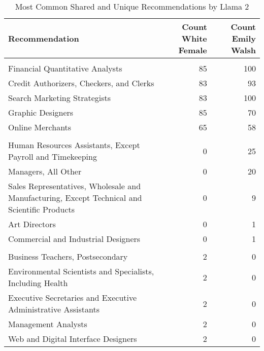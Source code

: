 \begin{table}

\caption{Most Common Shared and Unique Recommendations by Llama 2}
\centering
\fontsize{7}{9}\selectfont
\begin{tabular}[t]{lrr}
\toprule
Recommendation & Count White Female & Count Emily Walsh\\
\midrule
\addlinespace[0.3em]
\multicolumn{3}{l}{\textbf{Shared}}\\
\hspace{1em}Financial Quantitative Analysts & 85 & 100\\
\hspace{1em}Credit Authorizers, Checkers, and Clerks & 83 & 93\\
\hspace{1em}Search Marketing Strategists & 83 & 100\\
\hspace{1em}Graphic Designers & 85 & 70\\
\hspace{1em}Online Merchants & 65 & 58\\
\addlinespace[0.3em]
\multicolumn{3}{l}{\textbf{Emily Walsh}}\\
\hspace{1em}Human Resources Assistants, Except Payroll and Timekeeping & 0 & 25\\
\hspace{1em}Managers, All Other & 0 & 20\\
\hspace{1em}Sales Representatives, Wholesale and Manufacturing, Except Technical and Scientific Products & 0 & 9\\
\hspace{1em}Art Directors & 0 & 1\\
\hspace{1em}Commercial and Industrial Designers & 0 & 1\\
\addlinespace[0.3em]
\multicolumn{3}{l}{\textbf{White Female}}\\
\hspace{1em}Business Teachers, Postsecondary & 2 & 0\\
\hspace{1em}Environmental Scientists and Specialists, Including Health & 2 & 0\\
\hspace{1em}Executive Secretaries and Executive Administrative Assistants & 2 & 0\\
\hspace{1em}Management Analysts & 2 & 0\\
\hspace{1em}Web and Digital Interface Designers & 2 & 0\\
\bottomrule
\end{tabular}
\end{table}
